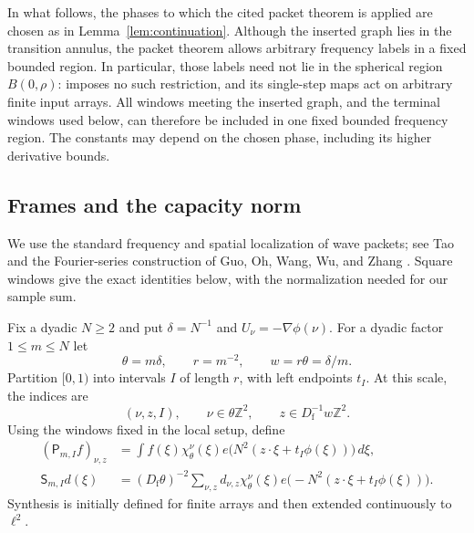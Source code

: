 In what follows, the phases to which the cited packet theorem is
applied are chosen as in Lemma~\ref{lem:continuation}.  Although the
inserted graph lies in the transition annulus, the packet theorem
allows arbitrary frequency labels in a fixed bounded region.  In
particular, those labels need not lie in the spherical region
$B(0,\rho)$: \cite[Definition~\PacketFamilyDefinition]{OpenAIPacket2026} imposes
no such restriction, and its single-step maps act on arbitrary
finite input arrays.  All windows meeting the inserted graph, and
the terminal windows used below, can therefore be included in one
fixed bounded frequency region.  The constants may depend on the
chosen phase, including its higher derivative bounds.

\subsection{Frames and the capacity norm}

We use the standard frequency and spatial localization of wave
packets; see Tao \cite[arXiv version~2, Section~4]{Tao2003} and the Fourier-series
construction of Guo, Oh, Wang, Wu, and Zhang
\cite[arXiv version~1, Section~4.1]{GOWWZ2025Packets}. Square windows give the exact
identities below, with the normalization needed for our sample sum.

Fix a dyadic $N\ge2$ and put $\delta=N^{-1}$ and
$U_\nu=-\nabla\phi(\nu)$.  For a dyadic factor $1\le m\le N$ let
\begin{equation}\label{eq:packet-scales}
 \theta=m\delta,\qquad r=m^{-2},\qquad
 w=r\theta=\delta/m.
\end{equation}
Partition $[0,1)$ into intervals $I$ of length $r$, with left
endpoints $t_I$.  At this scale, the indices are
\[
 (\nu,z,I),\qquad
 \nu\in\theta\mathbb Z^2,\qquad
 z\in D_{\mathrm f}^{-1}w\mathbb Z^2.
\]
Using the windows fixed in the local setup, define
\begin{align}
 (\mathsf P_{m,I}f)_{\nu,z}
 &=\int f(\xi)\chi_\theta^\nu(\xi)
              e\bigl(N^2(z\cdot\xi+t_I\phi(\xi))\bigr)\,d\xi,
              \label{eq:packet-analysis}\\
 \mathsf S_{m,I}d(\xi)
 &=(D_{\mathrm f}\theta)^{-2}
   \sum_{\nu,z}d_{\nu,z}\chi_\theta^\nu(\xi)
              e\bigl(-N^2(z\cdot\xi+t_I\phi(\xi))\bigr).
              \label{eq:packet-synthesis-general}
\end{align}
Synthesis is initially defined for finite arrays and then extended
continuously to $\ell^2$.

